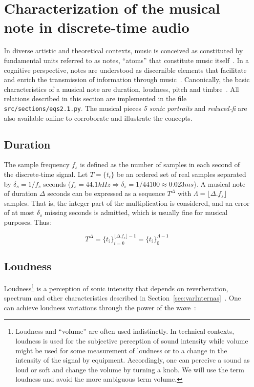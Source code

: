 \section{Characterization of the musical note in discrete-time audio} \label{sec:discNote}\label{sec:notaDisc}
In diverse artistic and theoretical contexts, music is conceived as constituted by fundamental units referred to as notes, ``atoms'' that constitute music itself~\cite{Wisnick, Lovelock, Webern}.
In a cognitive perspective, notes are understood as discernible elements that facilitate and enrich the transmission of information through music~\cite{Roederer, Lacerda}.
Canonically, the basic characteristics of a musical note are duration, loudness, pitch and timbre~\cite{Lacerda}.
All relations described in this section are implemented in the file \texttt{src/sections/eqs2.1.py}.
The musical pieces \emph{5 sonic portraits} and \emph{reduced-fi} are also available online to corroborate and illustrate the concepts.

\subsection{Duration}
The sample frequency $f_s$ is defined as the number of samples in each second of the discrete-time signal. Let $T=\{t_i\}$ be an ordered set of real samples separated by $\delta_s=1/f_s$ seconds ($f_s=44.1kHz \Rightarrow \delta_s=1/44100\approx 0.023ms$).
A musical note of duration $\Delta$ seconds can be expressed as a sequence $T^{\Delta}$ with $\Lambda = \lfloor \Delta . f_s \rfloor$ samples.
That is, the integer part of the multiplication is considered, and an error of at most $\delta_s$ missing seconds is admitted, which is usually fine for musical purposes. Thus:


\begin{equation}\label{eq:dur}
T^{\Delta}={\{t_i\}}_{i=0}^{\lfloor \Delta . f_s \rfloor -1} = \{t_i\}_0^{\Lambda-1}
\end{equation}

\subsection{Loudness}\label{subsec:volume}
Loudness\footnote{Loudness and ``volume'' are often used indistinctly.
In technical contexts, loudness is used for the subjective perception of sound intensity
while volume might be used for some measurement of loudness or to a change
in the intensity of the signal by equipment.
Accordingly, one can perceive a sound as loud or soft and change the volume
by turning a knob.
We will use the term loudness and avoid the more ambiguous term volume.} 
is a perception of sonic intensity that depends on reverberation,
spectrum and other characteristics described in Section~\ref{sec:varInternas}~\cite{Chowning}.
One can achieve loudness variations through the power of the wave~\cite{Chowning}:

